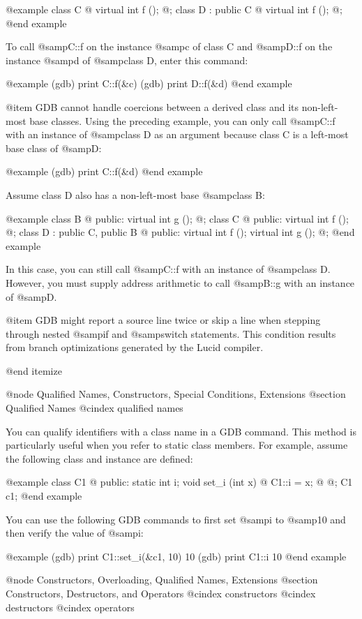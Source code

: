 @example
class C @{ virtual int f (); @}; 
class D : public C @{ virtual int f (); @}; 
@end example

To call @samp{C::f} on the instance @samp{c} of class C and
@samp{D::f} on the instance @samp{d} of @samp{class D}, enter this
command:

@example
(gdb) print C::f(&c) (gdb) print D::f(&d)
@end example

@item
GDB cannot handle coercions between a derived class and its
non-left-most base classes. Using the preceding example, you can only
call @samp{C::f} with an instance of @samp{class D} as an argument
because class C is a left-most base class of @samp{D}:

@example
(gdb) print C::f(&d) 	
@end example

Assume class D also has a non-left-most base @samp{class B}:

@example
class B @{ public: virtual int g (); @}; 
class C @{ public: virtual int f (); @};
class D : public C, public B @{
public: 
virtual int f ();
virtual int g (); 
@}; 
@end example

In this case, you can still call @samp{C::f} with an instance of
@samp{class D}. However, you must supply address arithmetic to call
@samp{B::g} with an instance of @samp{D}.

@item
GDB might report a source line twice or skip a line when stepping
through nested @samp{if} and @samp{switch} statements. This condition
results from branch optimizations generated by the Lucid compiler.

@end itemize

@node Qualified Names, Constructors, Special Conditions, Extensions
@section Qualified Names 
@cindex qualified names

You can qualify identifiers with a class name in a GDB command.  This
method is particularly useful when you refer to static class members.
For example, assume the following class and instance are defined:

@example
class C1 @{ 	
   public:
      static int i; 				
      void set_i (int x) @{ C1::i = x; @} 		 
   @}; 		
C1 c1; 
@end example

You can use the following GDB commands to first set @samp{i} to
@samp{10} and then verify the value of @samp{i}:

@example
(gdb) print C1::set_i(&c1, 10) 	 
10 	 
(gdb) print C1::i 10
@end example

@node Constructors, Overloading, Qualified Names, Extensions
@section Constructors, Destructors, and Operators 
@cindex constructors
@cindex destructors 
@cindex operators 


